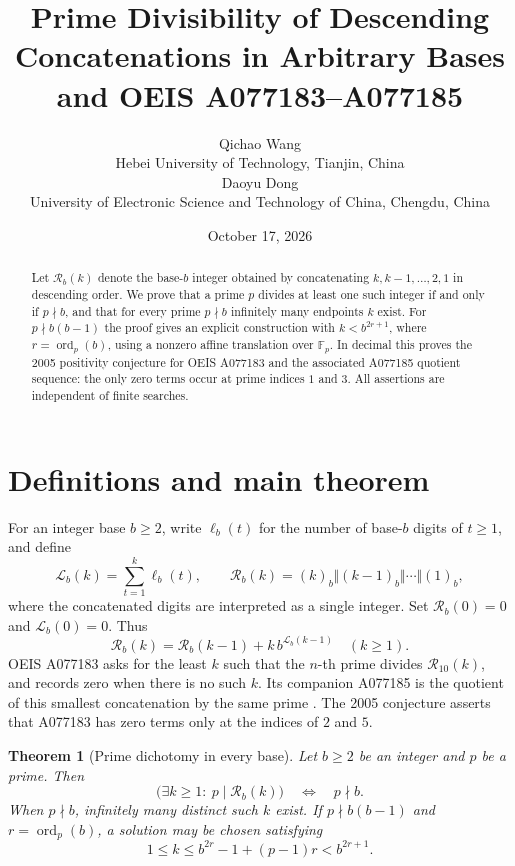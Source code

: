 \documentclass[9pt]{extarticle}
\title{Prime Divisibility of Descending Concatenations in Arbitrary Bases\\and OEIS A077183--A077185}
\author{Qichao Wang\\{\small Hebei University of Technology, Tianjin, China}\\[0.4em]Daoyu Dong\\{\small University of Electronic Science and Technology of China, Chengdu, China}}
\date{October 17, 2026}\linespread{0.97}\setlength{\abovedisplayskip}{6pt}\setlength{\belowdisplayskip}{6pt}\setlength{\abovedisplayshortskip}{3pt}\setlength{\belowdisplayshortskip}{3pt}
\newtheorem{theorem}{Theorem}
\newcommand{\ord}{\operatorname{ord}}
\newcommand{\len}{\mathcal{L}}
\newcommand{\rev}{\mathcal{R}}
\begin{document}
\maketitle
\begin{abstract}
Let $\rev_b(k)$ denote the base-$b$ integer obtained by concatenating
$k,k-1,\ldots,2,1$ in descending order. We prove that a prime $p$
divides at least one such integer if and only if $p\nmid b$, and
that for every prime $p\nmid b$ infinitely many endpoints $k$
exist. For $p\nmid b(b-1)$ the proof gives an explicit construction
with $k< b^{2r+1}$, where $r=\ord_p(b)$, using a nonzero affine
translation over $\mathbb F_p$. In decimal this proves the
2005 positivity conjecture for OEIS A077183 and the associated
A077185 quotient sequence: the only zero terms occur at prime indices
$1$ and $3$. All assertions are independent of finite searches.
\end{abstract}

\section{Definitions and main theorem}
For an integer base $b\ge2$, write $\ell_b(t)$ for the number of
base-$b$ digits of $t\ge1$, and define
\[
\len_b(k)=\sum_{t=1}^{k}\ell_b(t),\qquad
\rev_b(k)=(k)_b\Vert(k-1)_b\Vert\cdots\Vert(1)_b,
\]
where the concatenated digits are interpreted as a single integer.
Set $\rev_b(0)=0$ and $\len_b(0)=0$. Thus
\begin{equation}\label{eq:prepend}
\rev_b(k)=\rev_b(k-1)+k\,b^{\len_b(k-1)} \quad(k\ge1).
\end{equation}
OEIS A077183 asks for the least $k$ such that the $n$-th prime divides
$\rev_{10}(k)$, and records zero when there is no such $k$. Its
companion A077185 is the quotient of this smallest concatenation by
the same prime \cite{oeis183,oeis185,oeis422}. The 2005 conjecture
asserts that A077183 has zero terms only at the indices of $2$ and $5$.

\begin{theorem}[Prime dichotomy in every base]\label{thm:base}
Let $b\ge2$ be an integer and $p$ be a prime. Then
\[
\bigl(\exists k\ge1:\ p\mid\rev_b(k)\bigr)
\quad\Longleftrightarrow\quad p\nmid b.
\]
When $p\nmid b$, infinitely many distinct such $k$ exist. If
$p\nmid b(b-1)$ and $r=\ord_p(b)$, a solution may be chosen satisfying
\begin{equation}\label{eq:bound}
1\le k\le b^{2r}-1+(p-1)r < b^{2r+1}.
\end{equation}
\end{theorem}
\end{document}

